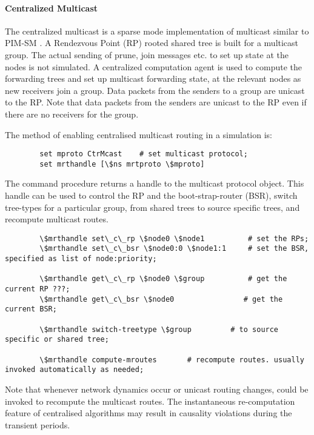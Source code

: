 \paragraph{Centralized Multicast}
The centralized multicast is a sparse mode implementation of multicast
similar to PIM-SM \cite{Deer94a:Architecture}.
A Rendezvous Point (RP) rooted shared tree is built
for a multicast group.  The actual sending of prune, join messages
etc. to set up state at the nodes is not simulated.  A centralized
computation agent is used to compute the forwarding trees and set up
multicast forwarding state,  at the relevant nodes as new
receivers join a group.  Data packets from the senders to a group are
unicast to the RP.  Note that data packets from the senders are
unicast to the RP even if there are no receivers for the group.

The method of enabling centralised multicast routing in a simulation is:
\begin{verbatim}
        set mproto CtrMcast    # set multicast protocol;
        set mrthandle [\$ns mrtproto \$mproto] 
\end{verbatim}
The command procedure 
returns a handle to the multicast protocol object.
This handle can be used to control the RP and the boot-strap-router (BSR),
switch tree-types for a particular group,
from shared trees to source specific trees, and
recompute multicast routes.
\begin{verbatim}
        \$mrthandle set\_c\_rp \$node0 \$node1          # set the RPs;
        \$mrthandle set\_c\_bsr \$node0:0 \$node1:1     # set the BSR, specified as list of node:priority;

        \$mrthandle get\_c\_rp \$node0 \$group          # get the current RP ???;
        \$mrthandle get\_c\_bsr \$node0                # get the current BSR;

        \$mrthandle switch-treetype \$group         # to source specific or shared tree;

        \$mrthandle compute-mroutes       # recompute routes. usually invoked automatically as needed;
\end{verbatim}

Note that whenever network dynamics occur or unicast routing changes,
 could be invoked to recompute the multicast routes.
The instantaneous re-computation feature of centralised algorithms
may result in causality violations during the transient
periods.

